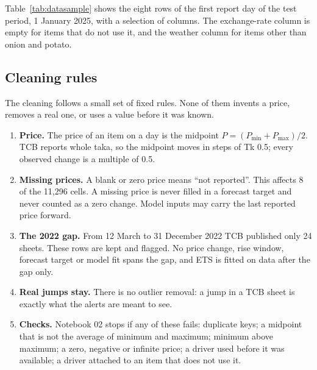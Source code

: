 Table~\ref{tab:datasample} shows the eight rows of the first report day of the test period, 1 January 2025, with a selection of columns. The exchange-rate column is empty for items that do not use it, and the weather column for items other than onion and potato.

\begin{table}[H]\centering\footnotesize
\caption[A sample of the data table]{A sample of the data table: the eight items on 1 January 2025 (prices in Tk; ``--'' = not used for this item).}\label{tab:datasample}
\end{table}

\subsection{Cleaning rules}
The cleaning follows a small set of fixed rules. None of them invents a price, removes a real one, or uses a value before it was known.
\begin{enumerate}[leftmargin=*,itemsep=2pt]
\item \textbf{Price.} The price of an item on a day is the midpoint $P = (P_{\min} + P_{\max})/2$. TCB reports whole taka, so the midpoint moves in steps of Tk 0.5; every observed change is a multiple of 0.5.
\item \textbf{Missing prices.} A blank or zero price means ``not reported''. This affects 8 of the 11,296 cells. A missing price is never filled in a forecast target and never counted as a zero change. Model inputs may carry the last reported price forward.
\item \textbf{The 2022 gap.} From 12 March to 31 December 2022 TCB published only 24 sheets. These rows are kept and flagged. No price change, rise window, forecast target or model fit spans the gap, and ETS is fitted on data after the gap only.
\item \textbf{Real jumps stay.} There is no outlier removal: a jump in a TCB sheet is exactly what the alerts are meant to see.
\item \textbf{Checks.} Notebook 02 stops if any of these fails: duplicate keys; a midpoint that is not the average of minimum and maximum; minimum above maximum; a zero, negative or infinite price; a driver used before it was available; a driver attached to an item that does not use it.
\end{enumerate}

